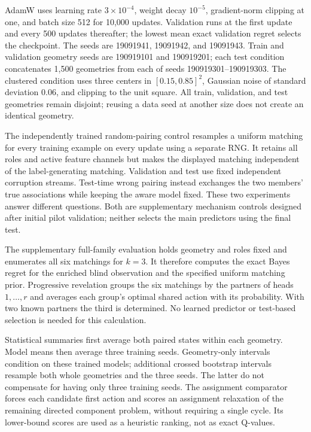 AdamW uses learning rate $3\times10^{-4}$, weight decay $10^{-5}$,
gradient-norm clipping at one, and batch size 512 for 10,000 updates.
Validation runs at the first update and every 500 updates thereafter;
the lowest mean exact validation regret selects the checkpoint. The seeds
are 19091941, 19091942, and 19091943. Train and validation geometry seeds
are 190919101 and 190919201; each test condition concatenates 1,500
geometries from each of seeds 190919301--190919303. The clustered condition
uses three centers in $[0.15,0.85]^2$, Gaussian noise of standard deviation
0.06, and clipping to the unit square. All train, validation, and test
geometries remain disjoint; reusing a data seed at another size does not
create an identical geometry.

The independently trained random-pairing control resamples a uniform matching
for every training example on every update using a separate RNG. It retains
all roles and active feature channels but makes the displayed matching
independent of the label-generating matching. Validation and test use fixed
independent corruption streams. Test-time wrong pairing instead exchanges
the two members' true associations while keeping the aware model fixed.
These two experiments answer different questions. Both are supplementary
mechanism controls designed after initial pilot validation; neither selects
the main predictors using the final test.

The supplementary full-family evaluation holds geometry and roles fixed
and enumerates all six matchings for $k=3$. It therefore computes the exact
Bayes regret for the enriched blind observation and the specified uniform
matching prior. Progressive revelation groups the six matchings by the
partners of heads $1,\ldots,r$ and averages each group's optimal shared
action with its probability. With two known partners the third is determined.
No learned predictor or test-based selection is needed for this calculation.

Statistical summaries first average both paired states within each geometry.
Model means then average three training seeds. Geometry-only intervals
condition on these trained models; additional crossed bootstrap intervals
resample both whole geometries and the three seeds. The latter do not
compensate for having only three training seeds. The assignment comparator
forces each candidate first action and scores an assignment relaxation of
the remaining directed component problem, without requiring a single cycle.
Its lower-bound scores are used as a heuristic ranking, not as exact Q-values.

